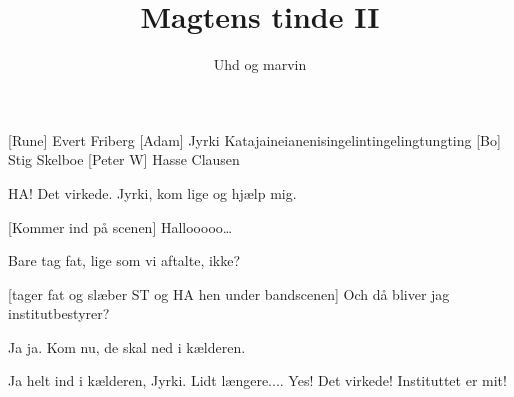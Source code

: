 \documentclass[a4paper,11pt]{article}
\title{Magtens tinde II}
\author{Uhd og marvin}
\begin{document}
\maketitle

\begin{roles}
[Rune] Evert Friberg
[Adam] Jyrki Katajaineianenisingelintingelingtungting
[Bo] Stig Skelboe
[Peter W] Hasse Clausen
\end{roles}

\begin{props}
\end{props}

\begin{sketch}
HA! Det virkede. 
Jyrki, kom lige og hjælp mig.

[Kommer ind på scenen] Hallooooo\ldots

 Bare tag fat, lige som vi aftalte, ikke?

[tager fat og slæber ST og HA hen under bandscenen] Och då bliver jag
institutbestyrer?

 Ja ja. Kom nu, de skal ned i kælderen. 


 Ja helt ind i kælderen, Jyrki. Lidt længere....  Yes! Det virkede! Instituttet er mit!

\end{sketch}
\end{document}
